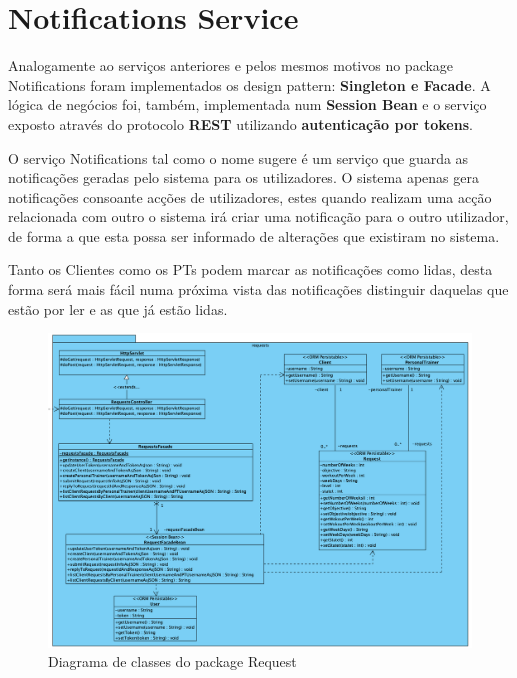 \section{Notifications Service}

\hspace{5mm} Analogamente ao serviços anteriores e pelos mesmos motivos no package Notifications foram implementados os design pattern: \textbf{Singleton e Facade}. A lógica de negócios foi, também, implementada num \textbf{Session Bean} e o serviço exposto através do protocolo \textbf{REST} utilizando \textbf{autenticação por tokens}.

\hspace{5mm} O serviço Notifications tal como o nome sugere é um serviço que guarda as notificações geradas pelo sistema para os utilizadores. O sistema apenas gera notificações consoante acções de utilizadores, estes quando realizam uma acção relacionada com outro o sistema irá criar uma notificação para o outro utilizador, de forma a que esta possa ser informado de alterações que existiram no sistema.

\hspace{5mm} Tanto os Clientes como os PTs podem marcar as notificações como lidas, desta forma será mais fácil numa próxima vista das notificações distinguir daquelas que estão por ler e as que já estão lidas.

\begin{figure}[H]
    \centering
    \includegraphics[scale=0.5]{images/arquitetura/requests-package.png}
    \caption{Diagrama de classes do package Request}
    \label{fig:my_label}
\end{figure}

